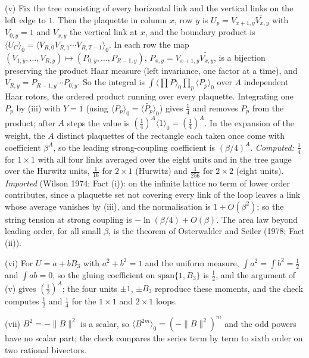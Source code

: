 (v) Fix the tree consisting of every horizontal link and the vertical links on the left edge to $1$. Then the plaquette in column $x$, row $y$ is $U_p = V_{x+1,y}\widetilde{V_{x,y}}$ with $V_{0,y} = 1$ and $V_{x,y}$ the vertical link at $x$, and the boundary product is $\langle U_C\rangle_0 = \langle V_{R,0}V_{R,1}\cdots V_{R,T-1}\rangle_0$. In each row the map $(V_{1,y}, \ldots, V_{R,y}) \mapsto (P_{0,y}, \ldots, P_{R-1,y})$, $P_{x,y} = V_{x+1,y}\widetilde{V_{x,y}}$, is a bijection preserving the product Haar measure (left invariance, one factor at a time), and $V_{R,y} = P_{R-1,y}\cdots P_{0,y}$. So the integral is $\int\langle\prod P\rangle_0\prod_{p}\langle P_p\rangle_0$ over $A$ independent Haar rotors, the ordered product running over every plaquette. Integrating one $P_p$ by (iii) with $Y = 1$ (using $\langle P_p\rangle_0 = \langle\widetilde{P_p}\rangle_0$) gives $\tfrac14$ and removes $P_p$ from the product; after $A$ steps the value is $(\tfrac14)^{A}\langle1\rangle_0 = (\tfrac14)^{A}$. In the expansion of the weight, the $A$ distinct plaquettes of the rectangle each taken once come with coefficient $\beta^{A}$, so the leading strong-coupling coefficient is $(\beta/4)^{A}$. \emph{Computed:} $\tfrac14$ for $1 \times 1$ with all four links averaged over the eight units and in the tree gauge over the Hurwitz units, $\tfrac1{16}$ for $2 \times 1$ (Hurwitz) and $\tfrac1{256}$ for $2 \times 2$ (eight units). \emph{Imported} (Wilson 1974; Fact (i)): on the infinite lattice no term of lower order contributes, since a plaquette set not covering every link of the loop leaves a link whose average vanishes by (iii), and the normalisation is $1 + O(\beta^2)$; so the string tension at strong coupling is $-\ln(\beta/4) + O(\beta)$. The area law beyond leading order, for all small $\beta$, is the theorem of Osterwalder and Seiler (1978; Fact (ii)).

(vi) For $U = a + bB_3$ with $a^2 + b^2 = 1$ and the uniform measure, $\int a^2 = \int b^2 = \tfrac12$ and $\int ab = 0$, so the gluing coefficient on $\mathrm{span}\{1, B_3\}$ is $\tfrac12$, and the argument of (v) gives $(\tfrac12)^{A}$; the four units $\pm1$, $\pm B_3$ reproduce these moments, and the check computes $\tfrac12$ and $\tfrac14$ for the $1 \times 1$ and $2 \times 1$ loops.

(vii) $B^2 = -\|B\|^2$ is a scalar, so $\langle B^{2m}\rangle_0 = (-\|B\|^2)^{m}$ and the odd powers have no scalar part; the check compares the series term by term to sixth order on two rational bivectors.

